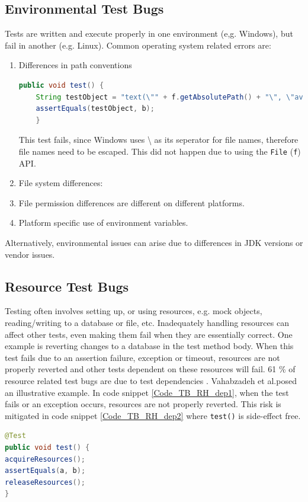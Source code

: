 \documentclass{uvamscse}
\newcommand{\Atestbugs}{Vahabzadeh et al.}
\begin{document}
\subsection{Environmental Test Bugs}
Tests are written and execute properly in one environment (e,g. Windows), but fail in another (e.g. Linux). Common operating system related errors are: 
\begin{enumerate}
	\item Differences in path conventions
	
	\begin{lstlisting}[language=java, caption=Path convention bug, label=Code_TB_OS_path]
	public void test() {
	String testObject = "text(\"" + f.getAbsolutePath() + "\", \"avrodata\")";
	assertEquals(testObject, b);
	}
	\end{lstlisting}
	
	This test fails, since Windows uses \textquotesingle \textbackslash \textquotesingle{}  as its seperator for file names, therefore file names need to be escaped. This did not happen due to using the \texttt{File} (\texttt{f}) API. 
	
	\item File system differences: 
	\item File permission differences are different on different platforms.
	\item Platform specific use of environment variables.
\end{enumerate}
Alternatively, environmental issues can arise due to differences in JDK versions or vendor issues.


\subsection{Resource Test Bugs}
\label{sec:TB_resource}
Testing often involves setting up, or using resources, e.g. mock objects, reading/writing to a database or file, etc. Inadequately handling resources can affect other tests, even making them fail when they are essentially correct. One example is reverting changes to a database in the test method body. When this test fails due to an assertion failure, exception or timeout, resources are not properly reverted and other tests dependent on these resources will fail. 61 \% of resource related test bugs are due to test dependencies \cite{vahabzadeh2015empirical}. \Atestbugs posed an illustrative example. In code snippet \ref{Code_TB_RH_dep1}, when the test fails or an exception occurs, resources are not properly reverted. This risk is mitigated in code snippet \ref{Code_TB_RH_dep2} where \texttt{test()} is side-effect free.
\begin{lstlisting}[language=java, caption=Setup and Teardown with side-effects, label=Code_TB_RH_dep1]
@Test
public void test() {
acquireResources();
assertEquals(a, b);
releaseResources();
}
\end{lstlisting}
\end{document}

